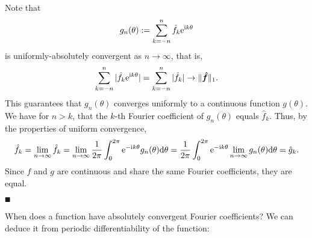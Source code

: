 Note that
\[
g_n(\ensuremath{\theta}) := \ensuremath{\sum}_{k = -n}^n \hat f_k {\rm e}^{{\rm i} k \ensuremath{\theta}}
\]
is uniformly-absolutely convergent as $n \ensuremath{\rightarrow} \ensuremath{\infty}$, that is,
\[
\sum_{k = -n}^n |\hat f_k {\rm e}^{{\rm i} k \theta}| = \sum_{k = -n}^n |\hat f_k| \rightarrow \|{\mbox{\boldmath$\hat f$\unboldmath}}\|_1.
\]
This guarantees that $g_n(\ensuremath{\theta})$ converges uniformly to a continuous function $g(\ensuremath{\theta})$. We have for $n > k$, that the $k$-th Fourier coefficient of $g_n(\ensuremath{\theta})$ equals $\hat f_k$. Thus, by the properties of uniform convergence,
\[
\hat f_k = \lim_{n \ensuremath{\rightarrow} \ensuremath{\infty}} \hat f_k =  \lim_{n \ensuremath{\rightarrow} \ensuremath{\infty}} {1 \over 2\ensuremath{\pi}} \ensuremath{\int}_0^{2\ensuremath{\pi}}  {\rm e}^{-{\rm i} k \ensuremath{\theta}} g_n(\ensuremath{\theta}) {\rm d}\ensuremath{\theta} =
 {1 \over 2\ensuremath{\pi}} \ensuremath{\int}_0^{2\ensuremath{\pi}}  {\rm e}^{-{\rm i} k \ensuremath{\theta}} \lim_{n \ensuremath{\rightarrow} \ensuremath{\infty}} g_n(\ensuremath{\theta}) {\rm d}\ensuremath{\theta} = \hat g_k.
\]
Since $f$ and $g$ are continuous and share the same Fourier coefficients, they are equal.

\ensuremath{\QED}

When does a function have absolutely convergent Fourier coefficients? We can deduce it from periodic differentiability of the function:


